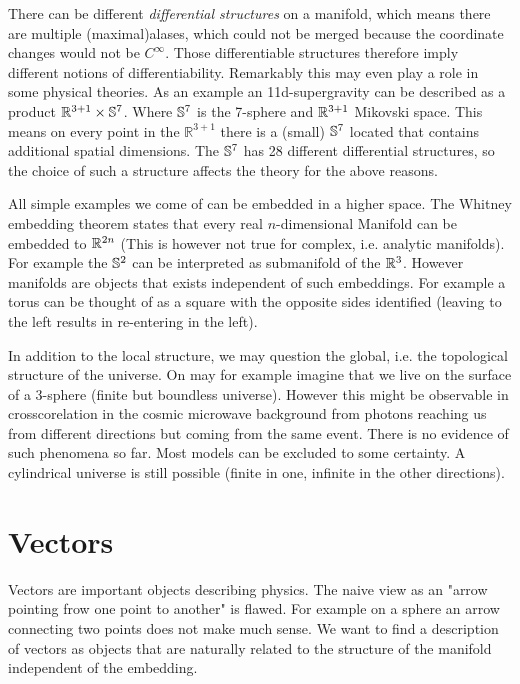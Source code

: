\begin{sidenote}
There can be different \emph{differential structures} on a manifold, 
which means there are multiple (maximal)alases, which
could not be merged because the coordinate changes would not be $C^\infty$. Those differentiable structures therefore imply different notions of differentiability. 
Remarkably this may even play a role in some physical theories. 
As an example an 11d-supergravity can be described as a product
$\mathbb{R}^{3+1}\times \mathbb{S}^7$.
Where $\mathbb{S}^7$ is the 7-sphere and $\mathbb{R}^{3+1}$ Mikovski space.
This means on every point in the $\mathbb{R}^{3+1}$ there is a (small) $\mathbb{S}^7$  located that contains additional spatial dimensions. 
The $\mathbb{S}^7$ has 28 different differential structures, so the choice of
such a structure affects the theory for the above reasons.
\end{sidenote}
All simple examples we come of can be embedded in a higher space. The Whitney
embedding theorem states that every real $n$-dimensional Manifold
can be embedded to $\mathbb{R}^{2n}$ (This is however not true for complex, i.e. analytic manifolds).
For example the $\mathbb{S}^2$ can be interpreted as submanifold of the $\mathbb{R}^3$.
However manifolds are objects that exists independent of such embeddings. 
For example a torus can be thought of as a square with the opposite sides identified (leaving to the left results in re-entering in the left).
\begin{sidenote}
In addition to the local structure, we may question the global, i.e. the
topological structure of the universe.
On may for example imagine that we live on the surface of a 3-sphere (finite but boundless universe). 
However this might be observable in crosscorelation in the cosmic microwave background from photons reaching us 
from different directions but coming from the same event. There is no evidence of such phenomena so far. 
Most models can be excluded to some certainty. A cylindrical
universe is still possible (finite in one, infinite in the
other directions).
\end{sidenote}
\section{Vectors}
Vectors are important objects describing physics. The naive view as an "arrow pointing frow one point to another" is flawed. 
For example on a sphere an arrow connecting two points does not make much sense.
We want to find a description of vectors as objects that are naturally related to the structure of the manifold independent of the embedding.
